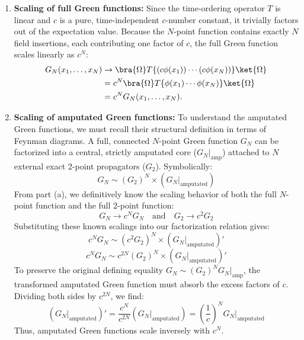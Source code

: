 \begin{enumerate}[label=(\alph*)]
    \item \textbf{Scaling of full Green functions:}
          Since the time-ordering operator $T$ is linear and $c$ is a pure, time-independent $c$-number constant, it trivially factors out of the expectation value. Because the $N$-point function contains exactly $N$ field insertions, each contributing one factor of $c$, the full Green function scales linearly as $c^N$:
          \[
              \begin{aligned}
                  G_N (x_1, \dots, x_N) & \to \bra{\Omega} T \{ (c\phi(x_1)) \cdots (c\phi(x_N)) \} \ket{\Omega} \\
                                        & = c^N \bra{\Omega} T \{ \phi(x_1) \cdots \phi(x_N) \} \ket{\Omega}     \\
                                        & = c^N G_N (x_1, \dots, x_N).
              \end{aligned}
          \]

    \item \textbf{Scaling of amputated Green functions:}
          To understand the amputated Green functions, we must recall their structural definition in terms of Feynman diagrams. A full, connected $N$-point Green function $G_N$ can be factorized into a central, strictly amputated core ($G_N|_{\text{amp}}$) attached to $N$ external exact 2-point propagators ($G_2$). Symbolically:
          \[
              G_N \sim (G_2)^N \times \left( G_N \big|_{\text{amputated}} \right)
          \]
          From part (a), we definitively know the scaling behavior of both the full $N$-point function and the full 2-point function:
          \[
              G_N \to c^N G_N \quad \text{and} \quad G_2 \to c^2 G_2
          \]
          Substituting these known scalings into our factorization relation gives:
          \[
              c^N G_N \sim (c^2 G_2)^N \times \left( G_N \big|_{\text{amputated}} \right)'
          \]
          \[
              c^N G_N \sim c^{2N} (G_2)^N \times \left( G_N \big|_{\text{amputated}} \right)'
          \]
          To preserve the original defining equality $G_N \sim (G_2)^N G_N|_{\text{amp}}$, the transformed amputated Green function must absorb the excess factors of $c$. Dividing both sides by $c^{2N}$, we find:
          \[
              \left( G_N \big|_{\text{amputated}} \right)' = \frac{c^N}{c^{2N}} \left( G_N \big|_{\text{amputated}} \right) = \left( \frac{1}{c} \right)^N G_N \big|_{\text{amputated}}
          \]
          Thus, amputated Green functions scale inversely with $c^N$.


\end{enumerate}
